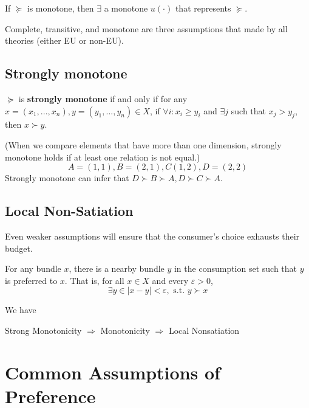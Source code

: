 \documentclass[11pt]{elegantbook}
\begin{document}
\begin{proposition}
    If $\succeq$ is monotone, then $\exists$ a monotone $u(\cdot)$ that represents $\succeq$.
\end{proposition}

\begin{note}
    Complete, transitive, and monotone are three assumptions that made by all theories (either EU or non-EU).
\end{note}

\subsection{Strongly monotone}
\begin{definition}
    \normalfont
    $\succeq$ is \textbf{strongly monotone} if and only if for any $x=(x_1,...,x_n), y=(y_1,...,y_n)\in X$, if $\forall i: x_{i} \geq y_{i}$ and $\exists j$ such that $x_{j}>y_{j}$, then $x \succ y$.
\end{definition}
(When we compare elements that have more than one dimension, strongly monotone holds if at least one relation is not equal.)
$$
A=(1,1), B=(2,1), C(1,2), D=(2,2)
$$
Strongly monotone can infer that $D \succ B \succ A, D \succ C \succ A$.

\subsection{Local Non-Satiation}
Even weaker assumptions will ensure that the consumer's choice exhausts their budget.
\begin{definition}
    \normalfont
    For any bundle $x$, there is a nearby bundle $y$ in the consumption set such that $y$ is preferred to $x$. That is, for all $x\in X$ and every $\varepsilon>0$,
    $$
    \exists y \in|x-y|<\varepsilon, \text { s.t. } y \succ x
    $$
\end{definition}

We have
\begin{center}
    Strong Monotonicity $\Rightarrow$ Monotonicity $\Rightarrow$ Local Nonsatiation
\end{center}


\section{Common Assumptions of Preference}
\end{document}

